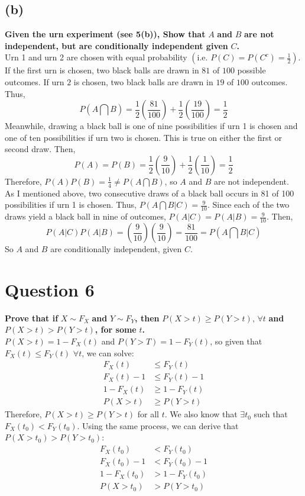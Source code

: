 \documentclass{article}
\newcommand{\intersect}{\bigcap}
\begin{document}
\subsection*{(b)}
\textbf{Given the urn experiment (see 5(b)), Show that} $A$ \textbf{and} $B$ \textbf{are not independent, but are conditionally independent given} $C$\textbf{.}
\medskip \\
Urn 1 and urn 2 are chosen with equal probability $\left(\text{i.e. }P(C)=P(C^c)=\frac{1}{2}\right)$. If the first urn is chosen, two black balls are drawn in $81$ of $100$ possible outcomes. If urn $2$ is chosen, two black balls are drawn in $19$ of $100$ outcomes. Thus,
\[
	P(A\intersect B)=\frac{1}{2}\left(\frac{81}{100}\right)+\frac{1}{2}\left(\frac{19}{100}\right)=\frac{1}{2}
\]
Meanwhile, drawing a black ball is one of nine possibilities if urn 1 is chosen and one of ten possibilities if urn two is chosen. This is true on either the first or second draw. Then,
\[
	P(A) = P(B) = \frac{1}{2}\left(\frac{9}{10}\right)+\frac{1}{2}\left(\frac{1}{10}\right)=\frac{1}{2}
\]
Therefore, $P(A)P(B)=\frac{1}{4}\neq P(A\intersect B)$, so $A$ and $B$ are not independent.
\smallskip \\
As I mentioned above, two consecutive draws of a black ball occurs in 81 of 100 possibilities if urn 1 is chosen. Thus, $P(A\intersect B|C)=\frac{9}{10}$. Since each of the two draws yield a black ball in nine of outcomes, $P(A|C)=P(A|B)=\frac{9}{10}$. Then,
\[
	P(A|C)P(A|B)=\left(\frac{9}{10}\right)\left(\frac{9}{10}\right)=\frac{81}{100}=P(A\intersect B|C)
\]
So $A$ and $B$ are conditionally independent, given $C$.


\section*{Question 6}
\textbf{Prove that if} $X\sim F_X$ \textbf{and} $Y\sim F_Y$\textbf{, then} $P(X>t)\geq P(Y>t)\text{, }\forall t$ \textbf{and} $P(X>t)> P(Y>t)$\textbf{, for some} $t$\textbf{.}
\medskip \\
$P(X>t)=1-F_X(t)$ and $P(Y>T)=1-F_Y(t)$, so given that $F_X(t)\leq F_Y(t)$ $\forall t$, we can solve:
\begin{align*}
	F_X(t)			&\leq F_Y(t)			\\
	F_X(t)-1		&\leq F_Y(t)-1			\\
	1-F_X(t)		&\geq 1-F_Y(t)			\\
	P(X>t)			&\geq P(Y>t)
\end{align*}
Therefore, $P(X>t) \geq P(Y>t)$ for all $t$. We also know that $\exists t_0$ such that $F_X(t_0)< F_Y(t_0)$. Using the same process, we can derive that $P(X>t_0)> P(Y>t_0)$:
\begin{align*}
	F_X(t_0)		&< F_Y(t_0)			\\
	F_X(t_0)-1		&< F_Y(t_0)-1		\\
	1-F_X(t_0)		&> 1-F_Y(t_0)		\\
	P(X>t_0)		&> P(Y>t_0)
\end{align*}
\end{document}
